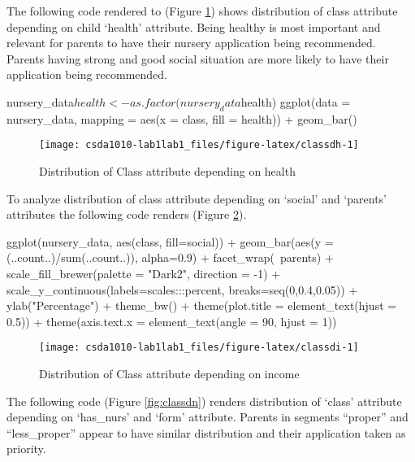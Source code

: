 The following code rendered to (Figure \ref{fig:classdh}) shows
distribution of class attribute depending on child `health' attribute.
Being healthy is most important and relevant for parents to have their
nursery application being recommended. Parents having strong and good
social situation are more likely to have their application being
recommended.

\begin{Schunk}
\begin{Sinput}
nursery_data$health <- as.factor(nursery_data$health)
ggplot(data = nursery_data, mapping = aes(x = class, fill = health)) +
  geom_bar()
\end{Sinput}
\begin{figure}[h]

{\centering \texttt{[image: csda1010-lab1lab1\_files/figure-latex/classdh-1]} 

}

\caption[Distribution of Class attribute depending on health]{Distribution of Class attribute depending on health}\label{fig:classdh}
\end{figure}
\end{Schunk}

To analyze distribution of class attribute depending on `social' and
`parents' attributes the following code renders (Figure
\ref{fig:classdi}).

\begin{Schunk}
\begin{Sinput}
ggplot(nursery_data, aes(class, fill=social)) + 
  geom_bar(aes(y = (..count..)/sum(..count..)), alpha=0.9) +
  facet_wrap(~parents) + 
  scale_fill_brewer(palette = "Dark2", direction = -1) +
  scale_y_continuous(labels=scales:::percent, breaks=seq(0,0.4,0.05)) +
  ylab("Percentage") +
  theme_bw() +
  theme(plot.title = element_text(hjust = 0.5)) +
  theme(axis.text.x = element_text(angle = 90, hjust = 1))
\end{Sinput}
\begin{figure}[h]

{\centering \texttt{[image: csda1010-lab1lab1\_files/figure-latex/classdi-1]} 

}

\caption[Distribution of Class attribute depending on income]{Distribution of Class attribute depending on income}\label{fig:classdi}
\end{figure}
\end{Schunk}

The following code (Figure \ref{fig:classdn}) renders distribution of
`class' attribute depending on `has\_nurs' and `form' attribute. Parents
in segments ``proper'' and ``less\_proper'' appear to have similar
distribution and their application taken as priority.

